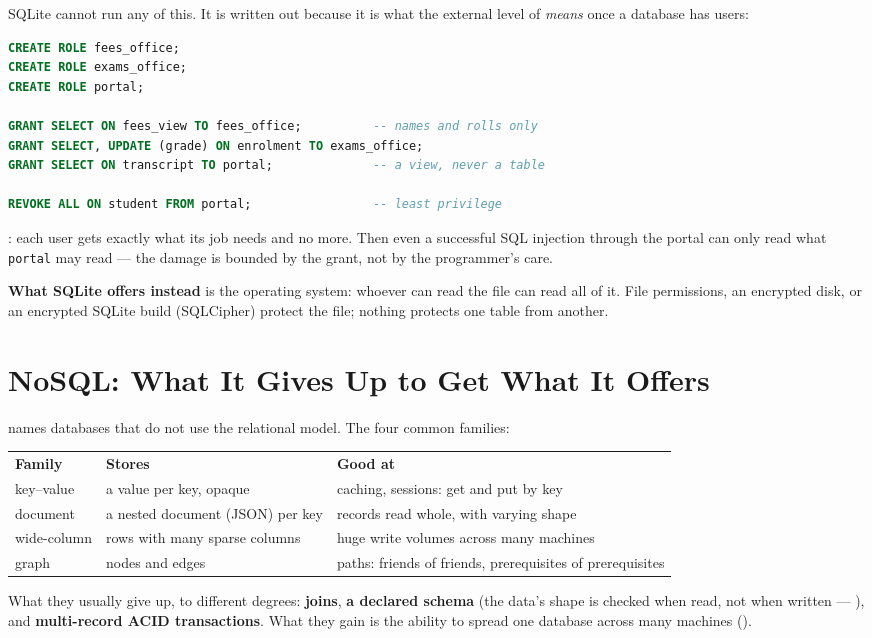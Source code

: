 \begin{examplebox}
SQLite cannot run any of this. It is written out because it is what the
external level of  \emph{means} once a database has users:

\begin{lstlisting}[language=sql]
CREATE ROLE fees_office;
CREATE ROLE exams_office;
CREATE ROLE portal;

GRANT SELECT ON fees_view TO fees_office;          -- names and rolls only
GRANT SELECT, UPDATE (grade) ON enrolment TO exams_office;
GRANT SELECT ON transcript TO portal;              -- a view, never a table

REVOKE ALL ON student FROM portal;                 -- least privilege
\end{lstlisting}

\smallskip
{}: each user gets exactly what its job needs and no more.
Then even a successful SQL injection through the portal can only read what
\texttt{portal} may read --- the damage is bounded by the grant, not by the
programmer's care.

\smallskip
\textbf{What SQLite offers instead} is the operating system: whoever can read
the file can read all of it. File permissions, an encrypted disk, or an
encrypted SQLite build (SQLCipher) protect the file; nothing protects one
table from another.
\end{examplebox}

\section{NoSQL: What It Gives Up to Get What It Offers}

\begin{definitionbox}
 names databases that do not use the relational model. The four
common families:

\smallskip
\begin{tabular}{@{}L{3.0cm}L{4.6cm}L{6.2cm}@{}}
\textbf{Family} & \textbf{Stores} & \textbf{Good at} \\
key--value & a value per key, opaque & caching, sessions: get and put by key \\
document & a nested document (JSON) per key & records read whole, with
  varying shape \\
wide-column & rows with many sparse columns & huge write volumes across many
  machines \\
graph & nodes and edges & paths: friends of friends, prerequisites of
  prerequisites \\
\end{tabular}

\smallskip
What they usually give up, to different degrees: \textbf{joins},
\textbf{a declared schema} (the data's shape is checked when read, not when
written --- ), and \textbf{multi-record ACID
transactions}. What they gain is the ability to spread one database across
many machines ().
\end{definitionbox}

